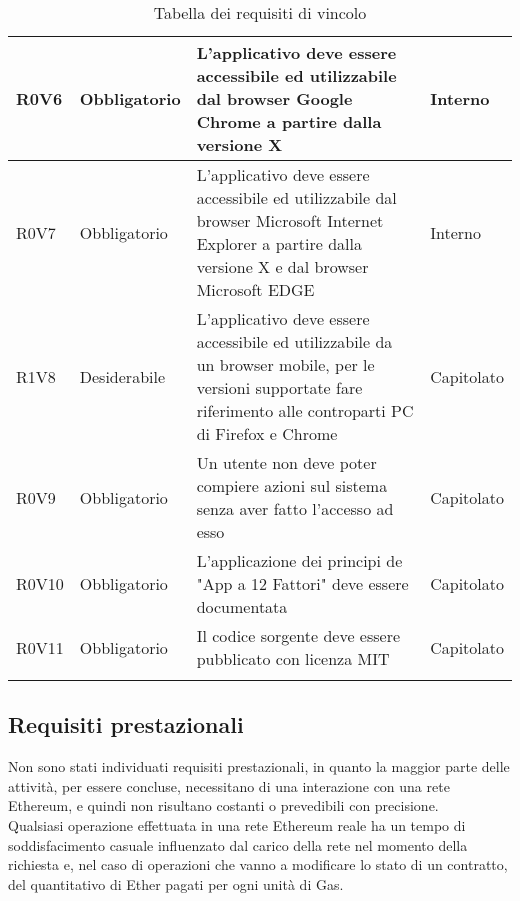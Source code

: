 \documentclass[AnalisiDeiRequisiti.tex]{subfiles}
\begin{document}
\begin{longtable}[H]{|p{2.5cm}|p{2.5cm}|p{5cm}|p{2cm}|}
	R0V6 & Obbligatorio & L'applicativo deve essere accessibile ed utilizzabile dal browser Google Chrome a partire dalla versione X & Interno \\ \hline %
	R0V7 & Obbligatorio & L'applicativo deve essere accessibile ed utilizzabile dal browser Microsoft Internet Explorer a partire dalla versione X e dal browser Microsoft EDGE & Interno \\ \hline %
	R1V8 & Desiderabile & L'applicativo deve essere accessibile ed utilizzabile da un browser mobile, per le versioni supportate fare riferimento alle controparti PC di Firefox e Chrome & Capitolato \\ \hline %
	R0V9 & Obbligatorio & Un utente non deve poter compiere azioni sul sistema senza aver fatto l'accesso ad esso & Capitolato \\ \hline
	R0V10 & Obbligatorio & L'applicazione dei principi de "App a 12 Fattori" deve essere documentata & Capitolato \\ \hline
	R0V11 & Obbligatorio & Il codice sorgente deve essere pubblicato con licenza MIT & Capitolato \\ \hline
	\caption{Tabella dei requisiti di vincolo}
\end{longtable}

\subsection{Requisiti prestazionali}

Non sono stati individuati requisiti prestazionali, in quanto la maggior parte delle attività, per essere concluse, necessitano di una interazione con una rete Ethereum, e quindi non risultano costanti o prevedibili con precisione.\\
Qualsiasi operazione effettuata in una rete Ethereum reale ha un tempo di soddisfacimento casuale influenzato dal carico della rete nel momento della richiesta e, nel caso di operazioni che vanno a modificare lo stato di un contratto, del quantitativo di Ether pagati per ogni unità di Gas.\\
 
\begin{comment}
\label{table:Tabella requisiti prestazionali}
\begin{longtable}[H]{|p{2.5cm}|p{2.5cm}|p{5cm}|p{2cm}|}
	\hline
	\rowcolor[HTML]{38FFF8} 
	\textbf{Identificatore} & \textbf{Importanza} & \textbf{Descrizione} & \textbf{Fonti} \\ \hline
	\endhead
	&  &  &  \\ \hline
	&  &  &  \\ \hline
	&  &  &  \\ \hline
	&  &  &  \\ \hline
	&  &  &  \\ \hline
	\caption{Tabella dei requisiti prestazionali}
\end{longtable}
\end{comment}
\end{document}
